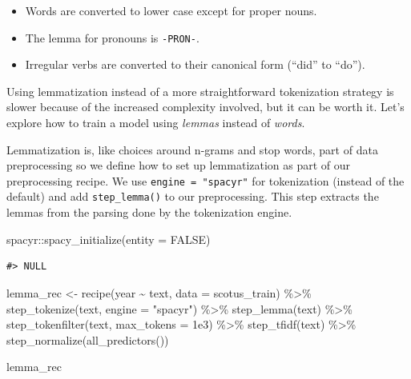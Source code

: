 \documentclass[
]{krantz}
\makeatletter
\newenvironment{Shaded}{\begin{snugshade}}{\end{snugshade}}
\newcommand{\AttributeTok}[1]{\textcolor[rgb]{0.77,0.63,0.00}{#1}}
\newcommand{\ConstantTok}[1]{\textcolor[rgb]{0.00,0.00,0.00}{#1}}
\newcommand{\FloatTok}[1]{\textcolor[rgb]{0.00,0.00,0.81}{#1}}
\newcommand{\FunctionTok}[1]{\textcolor[rgb]{0.00,0.00,0.00}{#1}}
\newcommand{\NormalTok}[1]{#1}
\newcommand{\OtherTok}[1]{\textcolor[rgb]{0.56,0.35,0.01}{#1}}
\newcommand{\SpecialCharTok}[1]{\textcolor[rgb]{0.00,0.00,0.00}{#1}}
\newcommand{\StringTok}[1]{\textcolor[rgb]{0.31,0.60,0.02}{#1}}
\newenvironment{kframe}{%
\medskip{}
\setlength{\fboxsep}{.8em}
 \def\at@end@of@kframe{}%
 \ifinner\ifhmode%
  \def\at@end@of@kframe{\end{minipage}}%
  \begin{minipage}{\columnwidth}%
 \fi\fi%
 \def\FrameCommand##1{\hskip\@totalleftmargin \hskip-\fboxsep
 \colorbox{shadecolor}{##1}\hskip-\fboxsep
     \hskip-\linewidth \hskip-\@totalleftmargin \hskip\columnwidth}%
 \MakeFramed {\advance\hsize-\width
   \@totalleftmargin\z@ \linewidth\hsize
   \@setminipage}}%
 {\par\unskip\endMakeFramed%
 \at@end@of@kframe}
\renewenvironment{Shaded}{\begin{kframe}}{\end{kframe}}
\makeatother
\begin{document}
\begin{itemize}
\item
  Words are converted to lower case except for proper nouns.
\item
  The lemma for pronouns is \texttt{-PRON-}.
\item
  Irregular verbs are converted to their canonical form (``did'' to ``do'').
\end{itemize}

Using lemmatization instead of a more straightforward tokenization strategy is slower because of the increased complexity involved, but it can be worth it. Let's explore how to train a model using \emph{lemmas} instead of \emph{words}.

Lemmatization is, like choices around n-grams and stop words, part of data preprocessing so we define how to set up lemmatization as part of our preprocessing recipe. We use \texttt{engine\ =\ "spacyr"} for tokenization (instead of the default) and add \texttt{step\_lemma()} to our preprocessing. This step extracts the lemmas from the parsing done by the tokenization engine.

\begin{Shaded}
\begin{Highlighting}[]
\NormalTok{spacyr}\SpecialCharTok{::}\FunctionTok{spacy\_initialize}\NormalTok{(}\AttributeTok{entity =} \ConstantTok{FALSE}\NormalTok{)}
\end{Highlighting}
\end{Shaded}

\begin{verbatim}
#> NULL
\end{verbatim}

\begin{Shaded}
\begin{Highlighting}[]
\NormalTok{lemma\_rec }\OtherTok{\textless{}{-}} \FunctionTok{recipe}\NormalTok{(year }\SpecialCharTok{\textasciitilde{}}\NormalTok{ text, }\AttributeTok{data =}\NormalTok{ scotus\_train) }\SpecialCharTok{\%\textgreater{}\%}
  \FunctionTok{step\_tokenize}\NormalTok{(text, }\AttributeTok{engine =} \StringTok{"spacyr"}\NormalTok{) }\SpecialCharTok{\%\textgreater{}\%}
  \FunctionTok{step\_lemma}\NormalTok{(text) }\SpecialCharTok{\%\textgreater{}\%}
  \FunctionTok{step\_tokenfilter}\NormalTok{(text, }\AttributeTok{max\_tokens =} \FloatTok{1e3}\NormalTok{) }\SpecialCharTok{\%\textgreater{}\%}
  \FunctionTok{step\_tfidf}\NormalTok{(text) }\SpecialCharTok{\%\textgreater{}\%}
  \FunctionTok{step\_normalize}\NormalTok{(}\FunctionTok{all\_predictors}\NormalTok{())}

\NormalTok{lemma\_rec}
\end{Highlighting}
\end{Shaded}
\end{document}
